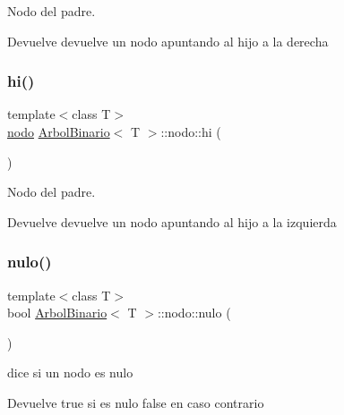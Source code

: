 Nodo del padre. 

\begin{DoxyReturn}{Devuelve}
devuelve un nodo apuntando al hijo a la derecha 
\end{DoxyReturn}
\mbox{\label{classArbolBinario_1_1nodo_a6dd19bf49c4336014f85f83f6a9f5943}} 
\subsubsection{\texorpdfstring{hi()}{hi()}}
{\footnotesize\ttfamily template$<$class T$>$ \\
\hyperlink{classArbolBinario_1_1nodo}{nodo} \hyperlink{classArbolBinario}{Arbol\+Binario}$<$ T $>$\+::nodo\+::hi (\begin{DoxyParamCaption}{ }\end{DoxyParamCaption})\hspace{0.3cm}{\ttfamily [inline]}}



Nodo del padre. 

\begin{DoxyReturn}{Devuelve}
devuelve un nodo apuntando al hijo a la izquierda 
\end{DoxyReturn}
\mbox{\label{classArbolBinario_1_1nodo_a92f885c1e463d5c24a66281c6589b4a3}} 
\subsubsection{\texorpdfstring{nulo()}{nulo()}}
{\footnotesize\ttfamily template$<$class T$>$ \\
bool \hyperlink{classArbolBinario}{Arbol\+Binario}$<$ T $>$\+::nodo\+::nulo (\begin{DoxyParamCaption}{ }\end{DoxyParamCaption})\hspace{0.3cm}{\ttfamily [inline]}}



dice si un nodo es nulo 

\begin{DoxyReturn}{Devuelve}
true si es nulo false en caso contrario 
\end{DoxyReturn}
\mbox{\label{classArbolBinario_1_1nodo_a274a6b1912079430c2be6fa3a9f2010d}} 
